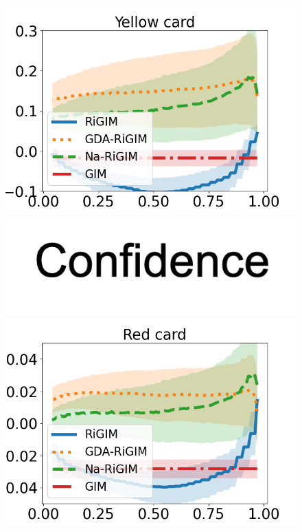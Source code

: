\documentclass{article}
\begin{document}
\begin{figure}[htbp]
\begin{minipage}{0.16\textwidth}
    \includegraphics[scale=0.14]{figures/soccer_risk_curve_Yel_shadow.png}\par
    \vspace{-0.05in}
    \includegraphics[scale=0.12]{figures/confidence_x_label.png}
    \end{minipage}
    \begin{minipage}{0.16\textwidth}
    \centering
    \includegraphics[scale=0.14]{figures/soccer_risk_curve_Red_shadow.png}\par

\end{minipage}
\end{figure}
\end{document}
